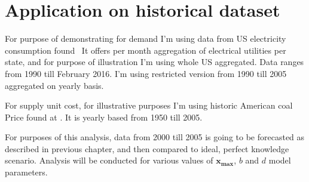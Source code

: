 
\chapter{Application on historical dataset}
\label{chap:Application on historical dataset}

For purpose of demonstrating for demand I'm using data from US electricity consumption found~\autocite{us-elec} It offers per month aggregation of electrical utilities per state, and for purpose of illustration I'm using whole US aggregated. Data ranges from 1990 till February 2016. I'm using restricted version from 1990 till 2005 aggregated on yearly basis.

For supply unit cost, for illustrative purposes I'm using historic American coal Price found at \autocite{us-coal}. It is yearly based from 1950 till 2005.

For purposes of this analysis, data from 2000 till 2005 is going to be forecasted as described in previous chapter, and then compared to ideal, perfect knowledge scenario. Analysis will be conducted for various values of $\mathbf{x_\max}$, $b$ and $d$ model parameters.
